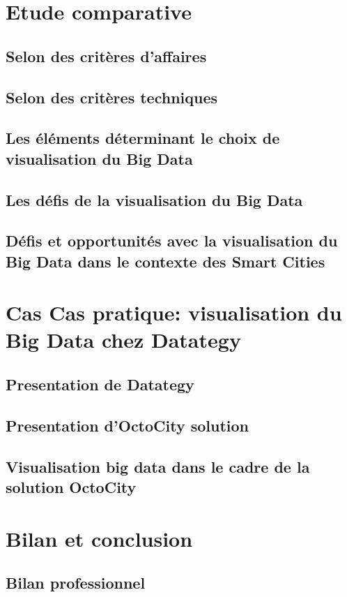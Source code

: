\documentclass[french, a4paper, 12pt]{report}
\begin{document}
\chapter{Etude comparative}
\section{Selon des critères d'affaires}
\section{Selon des critères techniques}
\section{Les éléments déterminant le choix de visualisation du Big Data}
\section{Les défis de la visualisation du Big Data}
\section{Défis et opportunités avec la visualisation du Big Data dans le contexte des Smart Cities}

\chapter{Cas Cas pratique: visualisation du Big Data chez Datategy}
\section{Presentation de Datategy}
\section{Presentation d’OctoCity solution}
\section{Visualisation big data dans le cadre de la solution OctoCity}


\chapter{ Bilan et conclusion}
\section{Bilan professionnel}
\end{document}
